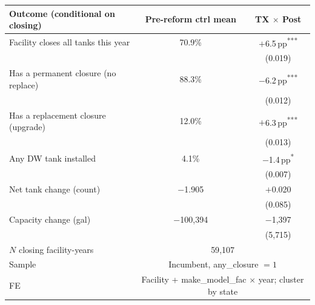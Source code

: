 \small
\begin{tabular}{lcc}
\toprule
Outcome (conditional on closing) & Pre-reform ctrl mean & TX $\times$ Post \\
\midrule
Facility closes all tanks this year     & 70.9\%       & $+$6.5\,pp\textsuperscript{***} \\
                                        &              & (0.019)                          \\
Has a permanent closure (no replace)    & 88.3\%       & $-$6.2\,pp\textsuperscript{***} \\
                                        &              & (0.012)                          \\
Has a replacement closure (upgrade)     & 12.0\%       & $+$6.3\,pp\textsuperscript{***} \\
                                        &              & (0.013)                          \\
Any DW tank installed                   & 4.1\%        & $-$1.4\,pp\textsuperscript{*}   \\
                                        &              & (0.007)                          \\
Net tank change (count)                 & $-$1.905     & $+$0.020                         \\
                                        &              & (0.085)                          \\
Capacity change (gal)                   & $-$100{,}394 & $-$1{,}397                       \\
                                        &              & (5{,}715)                        \\
\midrule
$N$ closing facility-years & \multicolumn{2}{c}{59{,}107}                                                       \\
Sample                     & \multicolumn{2}{c}{Incumbent, any\_closure $=1$}                                   \\
FE                         & \multicolumn{2}{c}{Facility + make\_model\_fac $\times$ year; cluster by state}    \\
\bottomrule
\end{tabular}
